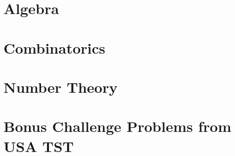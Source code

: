 

\part{Algebra}




\part{Combinatorics}








\part{Number Theory}





\part{Bonus Challenge Problems from USA TST}




